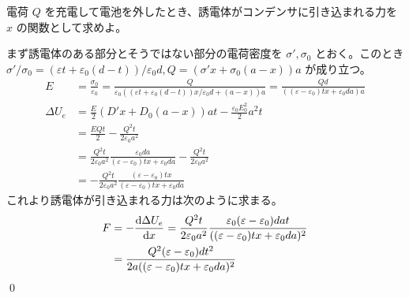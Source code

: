 \documentclass[uplatex,dvipdfmx,a4paper,11pt]{jlreq}
\makeatletter
\numberwithin{equation}{section}
\theoremstyle{definition}
\renewenvironment{proof}[1][\proofname]{\par
  \normalfont
  \topsep6\p@\@plus6\p@ \trivlist
  \item[\hskip\labelsep{\bfseries #1}\@addpunct{\bfseries}]\ignorespaces\quad\par
}{%
  \qed\endtrivlist\@endpefalse
}
\renewcommand\proofname{証明}
\makeatother
\begin{document}
\begin{problem}
電荷 $Q$ を充電して電池を外したとき、誘電体がコンデンサに引き込まれる力を $x$ の関数として求めよ。
\end{problem}
\begin{proof}
  まず誘電体のある部分とそうではない部分の電荷密度を $\sigma', \sigma_0$ とおく。このとき $\sigma'/\sigma_0 = (\varepsilon t + \varepsilon_0(d - t))/\varepsilon_0d, Q = (\sigma'x + \sigma_0(a - x))a$ が成り立つ。
  \begin{align}
    E          & = \frac{\sigma_0}{\varepsilon_0} = \frac{Q}{\varepsilon_0((\varepsilon t + \varepsilon_0(d - t))x/\varepsilon_0d + (a - x))a} = \frac{Qd}{((\varepsilon - \varepsilon_0)tx + \varepsilon_0da)a} \\
    \Delta U_e & = \frac{E}{2}(D'x + D_0(a - x))at - \frac{\varepsilon_0E_0^2}{2}a^2t                                                                                                                            \\
               & = \frac{EQt}{2} - \frac{Q^2t}{2\varepsilon_0a^2}                                                                                                                                                \\
               & = \frac{Q^2t}{2\varepsilon_0a^2}\frac{\varepsilon_0da}{(\varepsilon - \varepsilon_0)tx + \varepsilon_0da} - \frac{Q^2t}{2\varepsilon_0a^2}                                                      \\
               & = -\frac{Q^2t}{2\varepsilon_0a^2}\frac{(\varepsilon - \varepsilon_0)tx}{(\varepsilon - \varepsilon_0)tx + \varepsilon_0da}
  \end{align}
  これより誘電体が引き込まれる力は次のように求まる。
  \begin{align}
    F & = -\diff{\Delta U_e}{x} = \frac{Q^2t}{2\varepsilon_0a^2}\frac{\varepsilon_0(\varepsilon - \varepsilon_0)dat}{((\varepsilon - \varepsilon_0)tx + \varepsilon_0da)^2} \\
      & = \frac{Q^2(\varepsilon - \varepsilon_0)dt^2}{2a((\varepsilon - \varepsilon_0)tx + \varepsilon_0da)^2}
  \end{align}
\end{proof}
\end{document}
